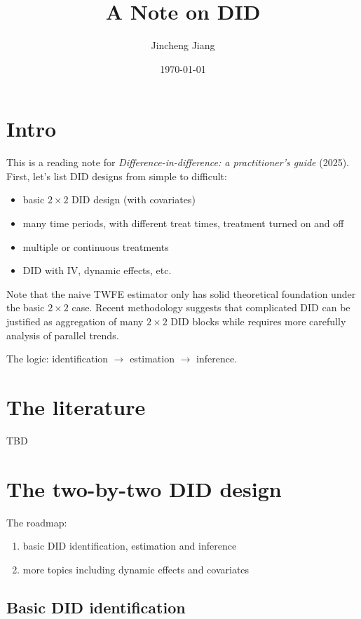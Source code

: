 \documentclass[12pt]{article}
\title{A Note on DID}
\author{Jincheng Jiang}
\date{\today}
\begin{document}
\maketitle

\section{Intro}

This is a reading note for \textit{Difference-in-difference: a
practitioner's guide} (2025). First, let's list DID designs from simple
to difficult:
\begin{itemize}
  \item basic \( 2 \times 2 \) DID design (with covariates)
  \item many time periods, with different treat times, treatment
    turned on and off
  \item multiple or continuous treatments
  \item DID with IV, dynamic effects, etc.
\end{itemize}
Note that the naive TWFE estimator only has solid theoretical
foundation under the basic \( 2 \times 2 \) case. Recent methodology suggests
that complicated DID can be justified as aggregation of many \( 2
\times 2 \) DID blocks while requires more carefully analysis of parallel trends.

The logic: identification \( \longrightarrow  \) estimation \( \longrightarrow  \) inference.

\section{The literature}

TBD

\section{The two-by-two DID design}

The roadmap:
\begin{enumerate}
  \item basic DID identification, estimation and inference
  \item more topics including dynamic effects and covariates
\end{enumerate}

\subsection{Basic DID identification}
\end{document}
